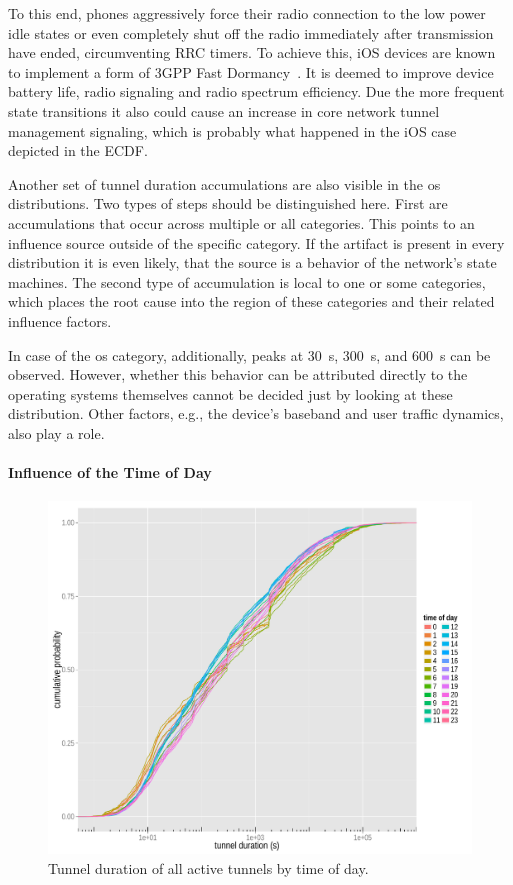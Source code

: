 To this end, phones aggressively force their radio connection to the low power idle states or even completely shut off the radio immediately after transmission have ended, circumventing \gls{RRC} timers. To achieve this, iOS devices are known to implement a form of \gls{3GPP} Fast Dormancy~\cite{gsma2011fdbestpract}. It is deemed to improve device battery life, radio signaling and radio spectrum efficiency. Due the more frequent state transitions it also could cause an increase in core network tunnel management signaling, which is probably what happened in the iOS case depicted in the \gls{ECDF}.

Another set of tunnel duration accumulations are also visible in the \gls{os} distributions. Two types of steps should be distinguished here. First are accumulations that occur across multiple or all categories. This points to an influence source outside of the specific category. If the artifact is present in every distribution it is even likely, that the source is a behavior of the network's state machines. The second type of accumulation is local to one or some categories, which places the root cause into the region of these categories and their related influence factors. 

In case of the \gls{os} category, additionally, peaks at \SI{30}{\second}, \SI{300}{\second}, and \SI{600}{\second} can be observed. However, whether this behavior can be attributed directly to the operating systems themselves cannot be decided just by looking at these distribution. Other factors, e.g., the device's baseband and user traffic dynamics, also play a role. 


\paragraph{Influence of the Time of Day}

\begin{figure}[htb]
	\centering
	\includegraphics[width=1.0\textwidth]{images/R-duration-timeofday-ecdf.pdf}
	\caption{Tunnel duration of all active tunnels by time of day.}
\label{c4:fig:duration-timeofday-ecdf}
\end{figure}

